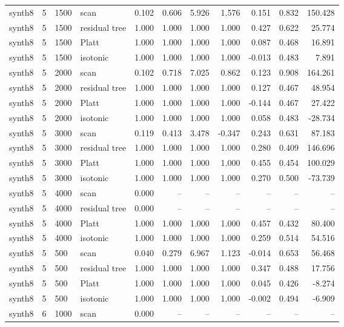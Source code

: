 \begin{tabular}{lrllrrrrrrr}
synth8 & 5 & 1500 & scan & 0.102 & 0.606 & 5.926 & 1.576 & 0.151 & 0.832 & 150.428 \\
synth8 & 5 & 1500 & residual tree & 1.000 & 1.000 & 1.000 & 1.000 & 0.427 & 0.622 & 25.774 \\
synth8 & 5 & 1500 & Platt & 1.000 & 1.000 & 1.000 & 1.000 & 0.087 & 0.468 & 16.891 \\
synth8 & 5 & 1500 & isotonic & 1.000 & 1.000 & 1.000 & 1.000 & -0.013 & 0.483 & 7.891 \\
synth8 & 5 & 2000 & scan & 0.102 & 0.718 & 7.025 & 0.862 & 0.123 & 0.908 & 164.261 \\
synth8 & 5 & 2000 & residual tree & 1.000 & 1.000 & 1.000 & 1.000 & 0.127 & 0.467 & 48.954 \\
synth8 & 5 & 2000 & Platt & 1.000 & 1.000 & 1.000 & 1.000 & -0.144 & 0.467 & 27.422 \\
synth8 & 5 & 2000 & isotonic & 1.000 & 1.000 & 1.000 & 1.000 & 0.058 & 0.483 & -28.734 \\
synth8 & 5 & 3000 & scan & 0.119 & 0.413 & 3.478 & -0.347 & 0.243 & 0.631 & 87.183 \\
synth8 & 5 & 3000 & residual tree & 1.000 & 1.000 & 1.000 & 1.000 & 0.280 & 0.409 & 146.696 \\
synth8 & 5 & 3000 & Platt & 1.000 & 1.000 & 1.000 & 1.000 & 0.455 & 0.454 & 100.029 \\
synth8 & 5 & 3000 & isotonic & 1.000 & 1.000 & 1.000 & 1.000 & 0.270 & 0.500 & -73.739 \\
synth8 & 5 & 4000 & scan & 0.000 & -- & -- & -- & -- & -- & -- \\
synth8 & 5 & 4000 & residual tree & 0.000 & -- & -- & -- & -- & -- & -- \\
synth8 & 5 & 4000 & Platt & 1.000 & 1.000 & 1.000 & 1.000 & 0.457 & 0.432 & 80.400 \\
synth8 & 5 & 4000 & isotonic & 1.000 & 1.000 & 1.000 & 1.000 & 0.259 & 0.514 & 54.516 \\
synth8 & 5 & 500 & scan & 0.040 & 0.279 & 6.967 & 1.123 & -0.014 & 0.653 & 56.468 \\
synth8 & 5 & 500 & residual tree & 1.000 & 1.000 & 1.000 & 1.000 & 0.347 & 0.488 & 17.756 \\
synth8 & 5 & 500 & Platt & 1.000 & 1.000 & 1.000 & 1.000 & 0.045 & 0.426 & -8.274 \\
synth8 & 5 & 500 & isotonic & 1.000 & 1.000 & 1.000 & 1.000 & -0.002 & 0.494 & -6.909 \\
synth8 & 6 & 1000 & scan & 0.000 & -- & -- & -- & -- & -- & -- \\

\end{tabular}
